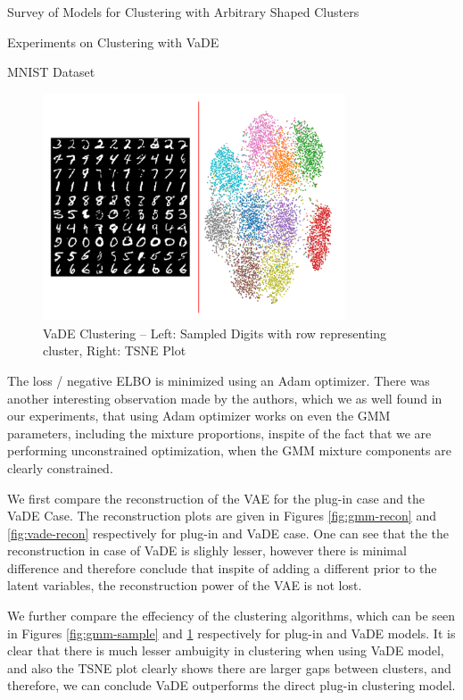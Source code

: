 \documentclass{article}
\begin{document}
\begin{psection}{Survey of Models for Clustering with Arbitrary Shaped Clusters}
\begin{psubsection}{Experiments on Clustering with VaDE}
\begin{pssubsection}{MNIST Dataset}
			\begin{figure}[h!]
				\centering
				\includegraphics[width=0.8\textwidth, trim={0.5 0.8cm 0.5 0.8cm}, clip]{includes/plots/mnist/sample-final.png}
				\caption{VaDE Clustering -- Left: Sampled Digits with row representing cluster, Right: TSNE Plot}
				\label{fig:vade-sample}
			\end{figure}

			The loss / negative ELBO is minimized using an Adam optimizer. There was another interesting observation made by the authors, which we as well found in our experiments, that using Adam optimizer works on even the GMM parameters, including the mixture proportions, inspite of the fact that we are performing unconstrained optimization, when the GMM mixture components are clearly constrained.

			We first compare the reconstruction of the VAE for the plug-in case and the VaDE Case. The reconstruction plots are given in Figures \ref{fig:gmm-recon} and \ref{fig:vade-recon} respectively for plug-in and VaDE case. One can see that the the reconstruction in case of VaDE is slighly lesser, however there is minimal difference and therefore conclude that inspite of adding a different prior to the latent variables, the reconstruction power of the VAE is not lost.

			We further compare the effeciency of the clustering algorithms, which can be seen in Figures \ref{fig:gmm-sample} and \ref{fig:vade-sample} respectively for plug-in and VaDE models. It is clear that there is much lesser ambuigity in clustering when using VaDE model, and also the TSNE plot clearly shows there are larger gaps between clusters, and therefore, we can conclude VaDE outperforms the direct plug-in clustering model.
			

\end{pssubsection}
\end{psubsection}
\end{psection}
\end{document}
